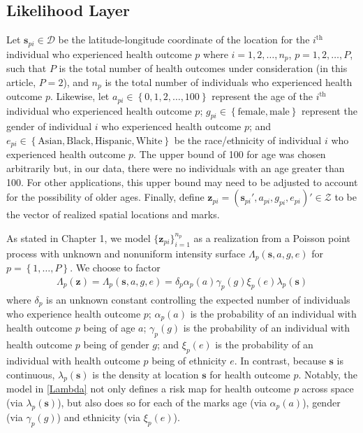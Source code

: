 \documentclass[final]{statsoc}
\begin{document}
\subsection{Likelihood Layer}\label{likelayer}
Let $\mathbf{s}_{pi} \in \mathcal{D}$ be the latitude-longitude coordinate
of the location for the $i^{\text{th}}$ 
individual who experienced health outcome $p$ where $i=1,2,\dots,n_p$, $p=1,2,\dots,P$, 
such that $P$ is the total number of health outcomes under consideration (in this article, $P=2$),
and $n_p$ is the total number of individuals who experienced health outcome $p$.
Likewise, let $a_{pi} \in \left\{0,1,2,\dots,100\right\}$ represent the age of the $i^{\text{th}}$ individual who
experienced health outcome $p$; 
$g_{pi} \in \left\{\text{female}, \text{male}\right\}$ represent the gender of individual $i$ who experienced health 
outcome $p$; and $e_{pi} \in \left\{\text{Asian}, \text{Black}, \text{Hispanic}, 
\text{White}\right\}$ be the race/ethnicity of individual $i$ who experienced health
outcome $p$. The upper bound of 100 for age was chosen arbitrarily but, in our data, 
there were no individuals with an age greater than 100. For other applications, this upper 
bound may need to be adjusted to account for the possibility of older ages. 
Finally, define $\mathbf{z}_{pi} = (\mathbf{s}_{pi}',a_{pi},g_{pi},e_{pi})' \in 
\mathcal{Z}$ to be the vector of realized spatial locations and marks.

As stated in Chapter 1, we model $\{\mathbf{z}_{pi}\}_{i=1}^{n_p}$ as a
realization from a Poisson point process with unknown and nonuniform intensity surface
$\Lambda_{p}(\mathbf{s}, a, g, e)$ for $p=\left\{1, \dots, P\right\}$.  We choose to factor 
\begin{align}
\Lambda_p(\mathbf{z}) = \Lambda_p(\mathbf{s}, a, g, e) = \delta_p\alpha_p(a)\gamma_p(g)\xi_p(e)
\lambda_p(\mathbf{s})
\label{Lambda}
\end{align}
where $\delta_p$ is an unknown constant controlling the 
expected number of individuals who experience health outcome $p$; 
$\alpha_p(a)$ is the probability of an individual with health outcome 
$p$ being of age $a$; $\gamma_p(g)$ is the probability of an individual with health
outcome $p$ being of gender $g$; and $\xi_p(e)$ is the probability of an individual 
with health outcome $p$ being of ethnicity $e$. In contrast, because $\mathbf{s}$ is 
continuous, $\lambda_p(\mathbf{s})$ 
is the density at location $\mathbf{s}$ for health outcome $p$. Notably, the model in 
\eqref{Lambda} not only defines a risk map for health outcome $p$ across space 
(via $\lambda_p(\mathbf{s})$), but also does so for each of the marks age 
(via $\alpha_p(a)$), gender (via $\gamma_p(g)$) and ethnicity (via $\xi_p(e)$).
\end{document}

